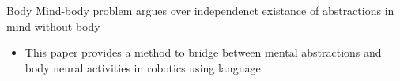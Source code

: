 \section{}
    \begin{frame}[allowframebreaks]{Body}
        Mind-body problem argues over independenct existance of abstractions in mind without body \cite{georgiev-2020-quantum-information-theoretic-approach-to-the-mind-brain-problem}
        
        \begin{itemize}
            \item This paper provides a method to bridge between mental abstractions and body neural activities in robotics using language
        \end{itemize}
    \end{frame}
    \subsection{}
     